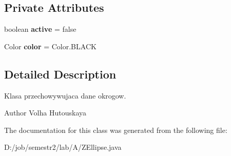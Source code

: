 \subsection*{Private Attributes}
\begin{DoxyCompactItemize}
\item 
\mbox{\label{class_z_ellipse_a5f83cf624b9d618d39a314bf529cbbfc}} 
boolean {\bfseries active} = false
\item 
\mbox{\label{class_z_ellipse_a030e36cd26072ad233c827d2772ab275}} 
Color {\bfseries color} = Color.\+B\+L\+A\+CK
\end{DoxyCompactItemize}


\subsection{Detailed Description}
Klasa przechowywujaca dane okrogow.

\begin{DoxyAuthor}{Author}
Volha Hutouskaya 
\end{DoxyAuthor}


The documentation for this class was generated from the following file\+:\begin{DoxyCompactItemize}
\item 
D\+:/job/semestr2/lab/\+A/Z\+Ellipse.\+java\end{DoxyCompactItemize}
